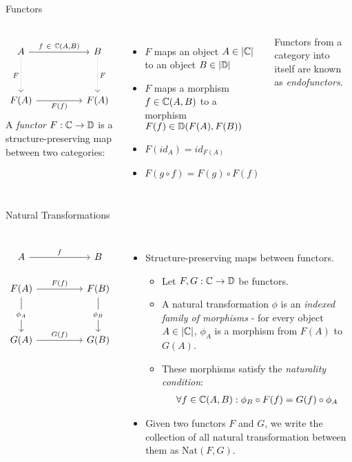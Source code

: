 \begin{frame}[fragile]{Functors}
	\begin{columns}
		\[\begin{tikzcd}
			A && B \\
			\\
			{F(A)} && {F(A)}
			\arrow["{f\ \in\ \mathbb{C}(A,B)}", from=1-1, to=1-3]
			\arrow["{F}"', dotted, from=1-1, to=3-1]
			\arrow["{F}", dotted, from=1-3, to=3-3]
			\arrow["{F(f)}"', from=3-1, to=3-3]
		\end{tikzcd}\]
		A \textit{functor} $F : \mathbb{C} \to \mathbb{D}$ is a structure-preserving map between two categories:
		\begin{itemize}
			\pause\item $F$ maps an object $A \in |\mathbb{C}|$ to an object $B \in |\mathbb{D}|$
			\pause\item $F$ maps a morphism $f \in \mathbb{C}(A,B)$ to a morphism $F(f) \in \mathbb{D}(F(A),F(B))$
			\pause \item $F(id_A) = id_{F(A)}$
			\pause \item $F(g \circ f) = F(g) \circ F(f)$
		\end{itemize}
		Functors from a category into itself are known as \textit{endofunctors}.
\end{columns}
\end{frame}
\begin{frame}[fragile]{Natural Transformations}
	\begin{columns}
		\[\begin{tikzcd}
			A && B \\
			{F(A)} && {F(B)} \\
			\\
			{G(A)} && {G(B)}
			\arrow["f", from=1-1, to=1-3]
			\arrow["{F(f)}", from=2-1, to=2-3]
			\arrow["{\phi_A}"{description}, from=2-1, to=4-1]
			\arrow["{\phi_B}"{description}, from=2-3, to=4-3]
			\arrow["{G(f)}", from=4-1, to=4-3]
		\end{tikzcd}\]
	    \begin{itemize}
	     \item Structure-preserving maps between functors.
	     \begin{itemize}
	      \pause\item Let $F,G : \mathbb{C} \to \mathbb{D}$ be functors.
	      \pause\item A natural transformation $\phi$ is an \textit{indexed family of morphisms} - for every object $A \in |\mathbb{C}|$,  $\phi_A$ is a morphism from $F(A)$ to $G(A)$.
	      \pause\item These morphisms satisfy the \textit{naturality condition}:
	      \begin{align*}
	       \forall f \in \mathbb{C}(A,B) : \phi_B \circ F(f) = G(f) \circ \phi_A
	      \end{align*}
	     \end{itemize}
	     \pause\item Given two functors $F$ and $G$, we write the collection of all natural transformation between them as $\text{Nat}(F, G)$.
	    \end{itemize}
	\end{columns}
\end{frame}
